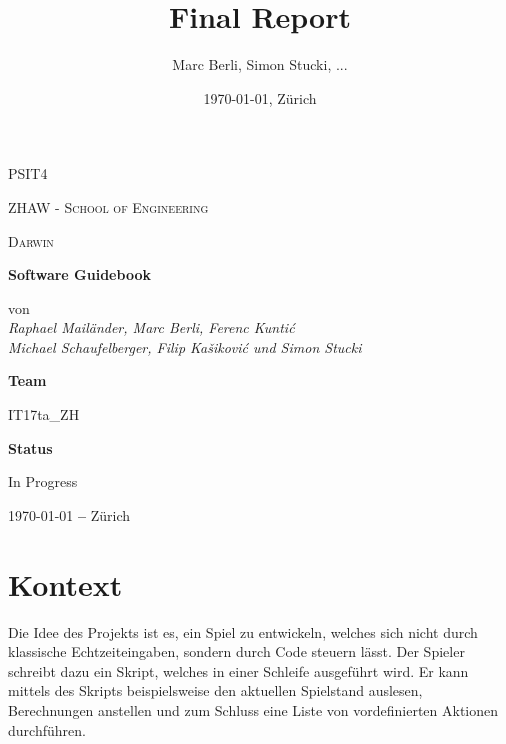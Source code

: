 \documentclass[11pt,a4paper,german]{scrartcl}
\title{Final Report}
\author{Marc Berli, Simon Stucki, ...}
\date{\today{}, Zürich}
\let\oldsection\section
\renewcommand\section{\clearpage\oldsection}
\begin{document}
\begin{titlepage}
  \centering
  {\scshape\LARGE PSIT4 \par}
  \vspace{1cm}
  {\scshape ZHAW - School of Engineering\par}
  \vspace{1cm}
  {\scshape\Large Darwin\par}
  \vspace{1.5cm}
  {\huge\bfseries Software Guidebook\par}
  \vspace{2cm}
  von
  \vspace{1em}
  \Large\itshape \\ Raphael Mailänder, Marc Berli, Ferenc Kuntić \\ Michael Schaufelberger, Filip Kašiković und Simon Stucki\par
  \vfill
  \textbf{Team}\par
  IT17ta\_ZH\par
  \vspace{2em}
  \textbf{Status}\par
  In Progress

  \vfill

  {\large \today \textbf{ --} Zürich\par}
\end{titlepage}

\tableofcontents

\newpage

\section{Kontext}

Die Idee des Projekts ist es, ein Spiel zu entwickeln, welches sich nicht durch klassische Echtzeiteingaben,
sondern durch Code steuern lässt.
Der Spieler schreibt dazu ein Skript, welches in einer Schleife ausgeführt wird.
Er kann mittels des Skripts beispielsweise den aktuellen Spielstand auslesen, Berechnungen anstellen und zum Schluss eine Liste von vordefinierten Aktionen durchführen.
\end{document}
